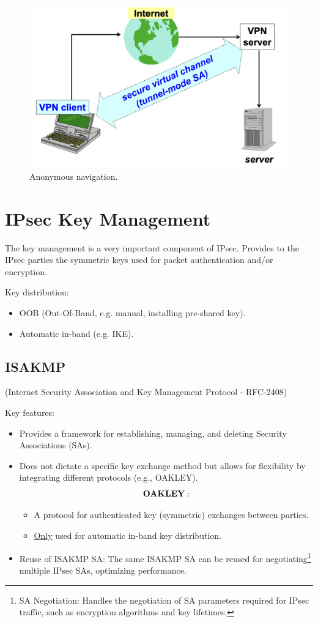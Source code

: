 \begin{figure}[H]
  \includegraphics[width=\linewidth]{Images/NetSec/anonnav.png}
  \caption{Anonymous navigation.}
  \label{fig:anonnav}
\end{figure}

\section{IPsec Key Management}
The key management is a very important component of IPsec. Provides to the IPsec parties the symmetric keys used for packet authentication and/or encryption.

Key distribution:
\begin{itemize}
    \item OOB (Out-Of-Band, e.g. manual, installing pre-shared key).
    \item Automatic in-band (e.g. IKE).
\end{itemize}

\subsection{ISAKMP}
\begin{center}
    (Internet Security Association and Key Management Protocol - RFC-2408)
\end{center}

Key features:
\begin{itemize}
    \item Provides a framework for establishing, managing, and deleting Security Associations (SAs).
    \item Does not dictate a specific key exchange method but allows for flexibility by integrating different protocols (e.g., OAKLEY).
    \[\bf{OAKLEY:}\]
    \begin{itemize}
        \item A protocol for authenticated key (symmetric) exchanges between parties.
        \item \underline{Only} used for automatic in-band key distribution.
    \end{itemize}
    \item Reuse of ISAKMP SA: The same ISAKMP SA can be reused for negotiating\footnote{SA Negotiation: Handles the negotiation of SA parameters required for IPsec traffic, such as encryption algorithms and key lifetimes.} multiple IPsec SAs, optimizing performance.
\end{itemize}

